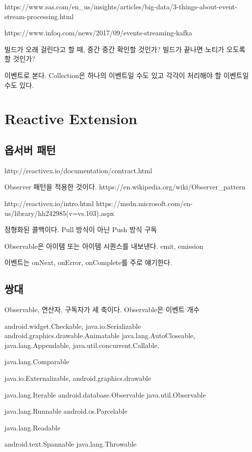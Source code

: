\documentclass{book}
\begin{document}
https://www.sas.com/en_us/insights/articles/big-data/3-things-about-event-stream-processing.html

https://www.infoq.com/news/2017/09/events-streaming-kafka

빌드가 오래 걸린다고 할 때, 중간 중간 확인할 것인가? 빌드가 끝나면 노티가 오도록 할 것인가?

이벤트로 본다. 
Collection은 하나의 이벤트일 수도 있고 각각이 처리해야 할 이벤트일 수도 있다.

\section{Reactive Extension}


\subsection{옵서버 패턴}
http://reactivex.io/documentation/contract.html

Observer 패턴을 적용한 것이다.
https://en.wikipedia.org/wiki/Observer_pattern

http://reactivex.io/intro.html
https://msdn.microsoft.com/en-us/library/hh242985(v=vs.103).aspx

정형화된 콜백이다.
Pull 방식이 아닌 Push 방식 구독

Observable은 아이템 또는 아이템 시퀀스를 내보낸다.
emit, emission

이벤트는 onNext, onError, onComplete를 주로 얘기한다.

\subsection{쌍대}

Observable, 연산자, 구독자가 세 축이다.
Observable은 이벤트 개수



android.widget.Checkable, java.io.Serializable
android.graphics.drawable.Animatable
java.lang.AutoCloseable, java.lang.Appendable, 
java.util.concurrent.Callable,

java.lang.Comparable

java.io.Externalizable, 
android.graphics.drawable

java.lang.Iterable
	android.database.Observable
		java.util.Observable
		
java.lang.Runnable
android.os.Parcelable

java.lang.Readable

android.text.Spannable
	java.lang.Throwable
\end{document}
